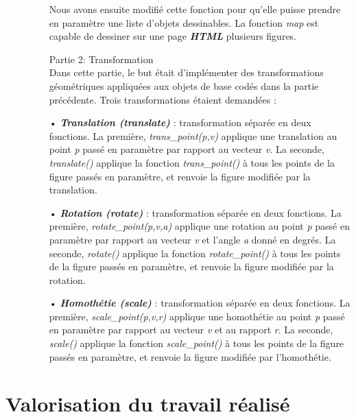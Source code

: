 \documentclass{article}
\begin{document}
\begin{description}
\begin{itemize}
\bigskip
Nous avons ensuite modifié cette fonction pour qu'elle puisse prendre en paramètre une liste d'objets dessinables. La fonction \emph{map} est capable de dessiner sur une page \textbf{\emph{HTML}} plusieurs figures.
\bigskip
\bigskip
\item[Partie 2: Transformation]\hfill \\ 


Dans cette partie, le but était d'implémenter des transformations géométriques appliquées aux objets de base codés dans la partie précédente.
\bigskip
Trois transformations étaient demandées :
\bigskip

\item[•] \textbf{\emph{Translation (translate)}} : transformation séparée en deux fonctions. La première, \emph{trans\_point(p,v)} applique une translation au point \emph{p} passé en paramètre par rapport au vecteur \emph{v}. La seconde, \emph{translate()} applique la fonction \emph{trans\_point()} à tous les points de la figure passés en paramètre, et renvoie la figure modifiée par la translation.
\bigskip
\item[•] \textbf{\emph{Rotation (rotate)} }: transformation séparée en deux fonctions. La première, \emph{rotate\_point(p,v,a)} applique une rotation au point \emph{p} passé en paramètre par rapport au vecteur \emph{v} et l'angle \emph{a} donné en degrés. La seconde, \emph{rotate()} applique la fonction \emph{rotate\_point()} à tous les points de la figure passés en paramètre, et renvoie la figure modifiée par la rotation.
\bigskip
\item[•] \textbf{\emph{Homothétie (scale)}} :  transformation séparée en deux fonctions. La première, \emph{scale\_point(p,v,r)} applique une homothétie au point \emph{p} passé en paramètre par rapport au vecteur \emph{v} et au rapport \emph{r}. La seconde, \emph{scale()} applique la fonction \emph{scale\_point()} à tous les points de la figure passés en paramètre, et renvoie la figure modifiée par l'homothétie.

\end{itemize}



\end{description}







\section{Valorisation du travail réalisé}
\end{document}
